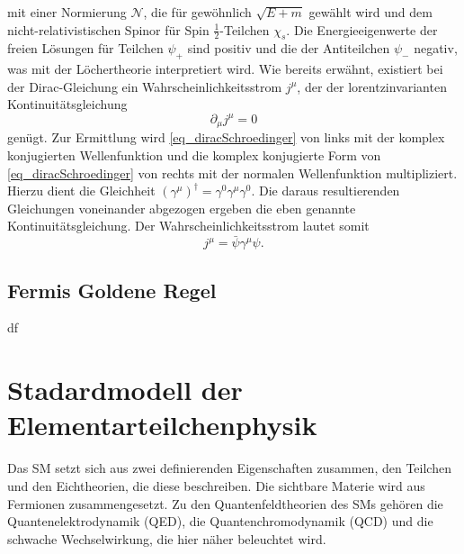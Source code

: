 \documentclass[11pt,a4paper,twoside]{report}
\begin{document}
mit einer Normierung $\mathcal{N}$, die für gewöhnlich $\sqrt{E + m}$ gewählt wird und dem nicht-relativistischen Spinor für Spin $\frac12$-Teilchen $\chi_s$.
Die Energieeigenwerte der freien Lösungen für Teilchen $\psi_+$ sind positiv und die der Antiteilchen $\psi_-$ negativ, was mit der Löchertheorie interpretiert
wird. Wie bereits erwähnt, existiert bei der Dirac-Gleichung ein Wahrscheinlichkeitsstrom $j^\mu$, der der lorentzinvarianten Kontinuitätsgleichung
\begin{equation}
 \partial_\mu j^\mu = 0
\end{equation}
genügt. Zur Ermittlung wird \eqref{eq_diracSchroedinger} von links mit der komplex konjugierten Wellenfunktion und die komplex konjugierte
Form von \eqref{eq_diracSchroedinger} von rechts mit der normalen Wellenfunktion multipliziert. Hierzu dient die Gleichheit 
$(\gamma^\mu)^\dagger = \gamma^0\gamma^\mu\gamma^0$. Die daraus resultierenden Gleichungen voneinander abgezogen ergeben die eben genannte Kontinuitätsgleichung.
Der Wahrscheinlichkeitsstrom lautet somit
\begin{equation}
 j^\mu = \bar \psi \gamma^\mu \psi.
\end{equation}


\subsection{Fermis Goldene Regel}
df
\section{Stadardmodell der Elementarteilchenphysik}
Das SM setzt sich aus zwei definierenden Eigenschaften zusammen, den Teilchen und den Eichtheorien, die diese beschreiben. Die sichtbare Materie wird 
aus Fermionen zusammengesetzt. Zu den Quantenfeldtheorien des SMs gehören die Quantenelektrodynamik (QED), die Quantenchromodynamik (QCD) und die schwache
Wechselwirkung, die hier näher beleuchtet wird. 
\end{document}
